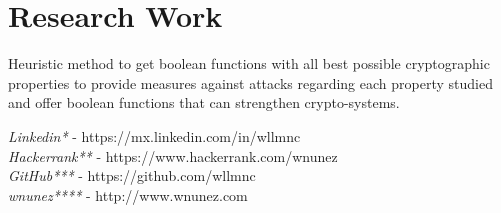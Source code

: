 \documentclass[10pt]{article} %
\begin{document}

\section{Research Work}

{
Heuristic method to get boolean functions with all best possible cryptographic properties to provide measures against attacks regarding each property studied and offer boolean functions that can strengthen crypto-systems.
}



{
\textit{Linkedin*}  - https://mx.linkedin.com/in/wllmnc \\ 
\textit{Hackerrank**}  - https://www.hackerrank.com/wnunez  \\ 
\textit{GitHub***}  - https://github.com/wllmnc \\ 
\textit{wnunez****}  - http://www.wnunez.com \\ 
}
\end{document}
